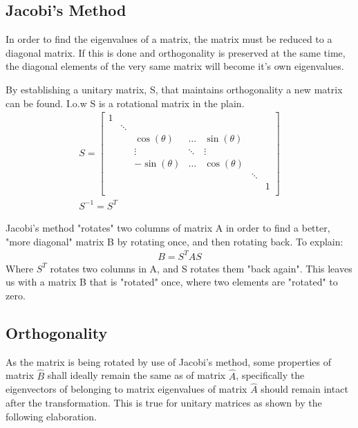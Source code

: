 \documentclass[11pt,a4paper,notitlepage]{article}
\begin{document}
\subsection{Jacobi's Method}\label{sec:jac}
In order to find the eigenvalues of a matrix, the matrix must be reduced to a diagonal matrix. If this is done and orthogonality is preserved at the same time, the diagonal elements of the very same matrix will become it's own eigenvalues. 

By establishing a unitary matrix, S, that maintains orthogonality a new matrix can be found.
I.o.w S is a rotational matrix in the plain.
\begin{align*}
	S = \begin{bmatrix}
		 1 & & & & &  \\
		 & \ddots & & & & \\
		 & & \cos(\theta)& \hdots & \sin(\theta)& & \\
		 & & \vdots & \ddots & \vdots & & \\
		 & & -\sin(\theta)& \hdots & \cos(\theta) & & \\
		 & & & & & \ddots & \\
		 & & & & & & 1 \\
	\end{bmatrix} \\
	S^{-1} = S^T
\end{align*}

Jacobi's method "rotates" two columns of matrix A in order to find a better, "more diagonal" matrix B by rotating once, and then rotating back. To explain:
\begin{align*}
	B = S^T A S
\end{align*}
Where $S^T$ rotates two columns in A, and S rotates them "back again". This leaves us with a matrix B that is "rotated" once, where two elements are "rotated" to zero. 
\subsection{Orthogonality}
As the matrix is being rotated by use of Jacobi's method, some properties of matrix $\hat{B}$ shall ideally remain the same as of matrix $\hat{A}$, specifically the eigenvectors of belonging to matrix eigenvalues of matrix $\hat{A}$ should remain intact after the transformation. This is true for unitary matrices as shown by the following elaboration.
\end{document}
